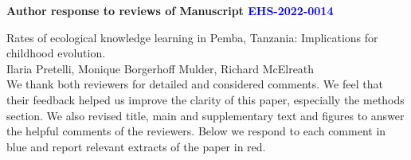 \documentclass{article}
\newcommand{\rev}[1]{{\color{Red}#1}}
\newcommand{\comment}[1]{{\color{Blue}#1}}
\begin{document}
\begin{center}
{\Large\bf Author response to reviews of Manuscript \textcolor{blue}{EHS-2022-0014}}
\end{center}
{\Large Rates of ecological knowledge learning in Pemba, Tanzania: Implications for childhood evolution.}\\[1em]
{Ilaria Pretelli, Monique Borgerhoff Mulder, Richard McElreath}\\

We thank both reviewers for detailed and considered comments. We feel that their feedback helped us improve the clarity of this paper, especially the methods section. We also revised title, main and supplementary text and figures to answer the helpful comments of the reviewers. Below we \comment{respond to each comment in blue} and \rev{report relevant extracts of the paper in red}.
\end{document}
